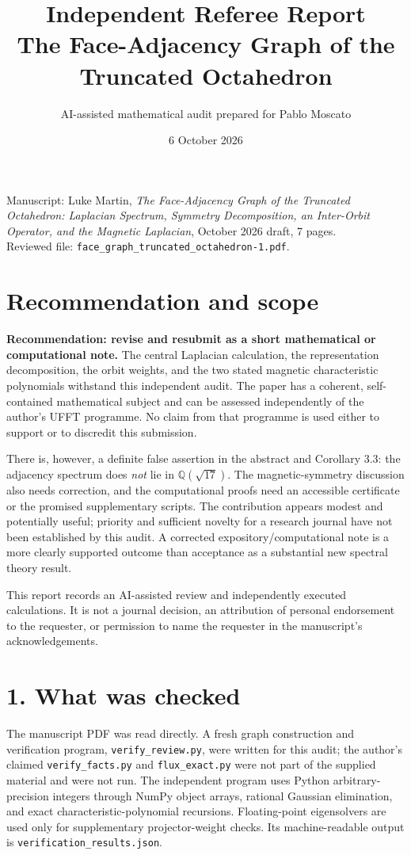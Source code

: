\documentclass[11pt,a4paper]{article}
\title{Independent Referee Report\\\large The Face-Adjacency Graph of the Truncated Octahedron}
\author{AI-assisted mathematical audit prepared for Pablo Moscato}
\date{6 October 2026}
\newcommand{\Q}{\mathbb Q}
\begin{document}
\maketitle
\begin{center}\small
Manuscript: Luke Martin, \emph{The Face-Adjacency Graph of the Truncated Octahedron: Laplacian Spectrum, Symmetry Decomposition, an Inter-Orbit Operator, and the Magnetic Laplacian}, October 2026 draft, 7 pages.\\
Reviewed file: \texttt{face\_graph\_truncated\_octahedron-1.pdf}.
\end{center}

\section*{Recommendation and scope}
\textbf{Recommendation: revise and resubmit as a short mathematical or computational note.}
The central Laplacian calculation, the representation decomposition, the orbit weights, and the two stated magnetic characteristic polynomials withstand this independent audit. The paper has a coherent, self-contained mathematical subject and can be assessed independently of the author's UFFT programme. No claim from that programme is used either to support or to discredit this submission.

There is, however, a definite false assertion in the abstract and Corollary 3.3: the adjacency spectrum does \emph{not} lie in $\Q(\sqrt{17})$. The magnetic-symmetry discussion also needs correction, and the computational proofs need an accessible certificate or the promised supplementary scripts. The contribution appears modest and potentially useful; priority and sufficient novelty for a research journal have not been established by this audit. A corrected expository/computational note is a more clearly supported outcome than acceptance as a substantial new spectral theory result.

This report records an AI-assisted review and independently executed calculations. It is not a journal decision, an attribution of personal endorsement to the requester, or permission to name the requester in the manuscript's acknowledgements.

\section*{1. What was checked}
The manuscript PDF was read directly. A fresh graph construction and verification program, \texttt{verify\_review.py}, were written for this audit; the author's claimed \texttt{verify\_facts.py} and \texttt{flux\_exact.py} were not part of the supplied material and were not run. The independent program uses Python arbitrary-precision integers through NumPy object arrays, rational Gaussian elimination, and exact characteristic-polynomial recursions. Floating-point eigensolvers are used only for supplementary projector-weight checks. Its machine-readable output is \texttt{verification\_results.json}.
\end{document}
